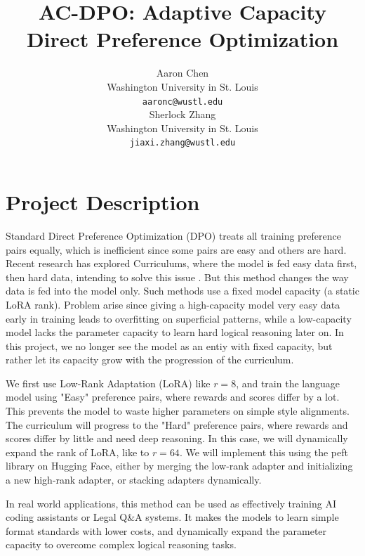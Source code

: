 \documentclass{article}
\title{AC-DPO: Adaptive Capacity Direct Preference Optimization}
\author{
  Aaron Chen \\
  Washington University in St. Louis \\
  \texttt{aaronc@wustl.edu} \\
  \And
  Sherlock Zhang \\
  Washington University in St. Louis \\
  \texttt{jiaxi.zhang@wustl.edu} \\
}
\begin{document}
\maketitle



\vspace{-2.5em}
\section{Project Description}

Standard Direct Preference Optimization (DPO) treats all training preference pairs equally, which is inefficient since some pairs are easy and others are hard. Recent research has explored Curriculums, where the model is fed easy data first, then hard data, intending to solve this issue \cite{croitoru2024curriculum}. But this method changes the way data is fed into the model only. Such methods use a fixed model capacity (a static LoRA rank). Problem arise since giving a high-capacity model very easy data early in training leads to overfitting on superficial patterns, while a low-capacity model lacks the parameter capacity to learn hard logical reasoning later on. In this project, we no longer see the model as an entiy with fixed capacity, but rather let its capacity grow with the progression of the curriculum.

We first use Low-Rank Adaptation (LoRA) like $r=8$, and train the language model using "Easy" preference pairs, where rewards and scores differ by a lot. This prevents the model to waste higher parameters on simple style alignments. The curriculum will progress to the "Hard" preference pairs, where rewards and scores differ by little and need deep reasoning. In this case, we will dynamically expand the rank of LoRA, like to $r=64$. We will implement this using the peft library on Hugging Face, either by merging the low-rank adapter and initializing a new high-rank adapter, or stacking adapters dynamically.

In real world applications, this method can be used as effectively training AI coding assistants or Legal Q\&A systems. It makes the models to learn simple format standards with lower costs, and dynamically expand the parameter capacity to overcome complex logical reasoning tasks.
\end{document}
